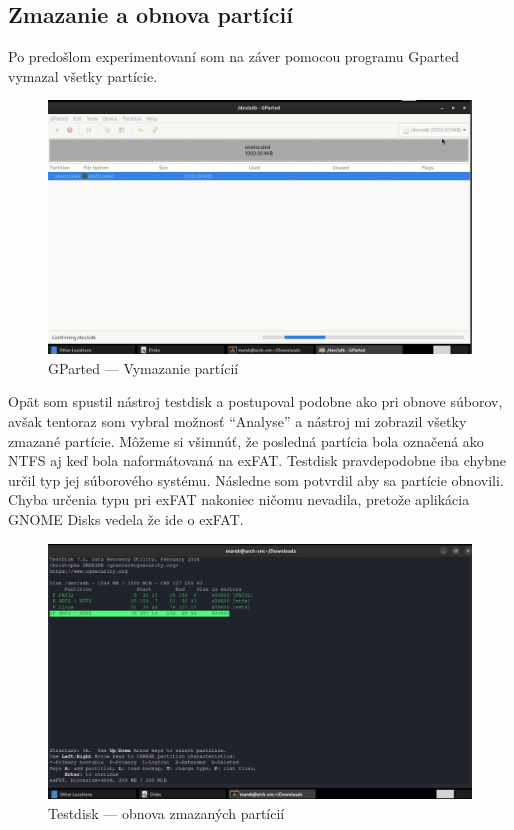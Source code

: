 \documentclass[12pt,oneside,slovak,a4paper]{article}
\begin{document}
\subsection{Zmazanie a obnova partícií}
Po predošlom experimentovaní som na záver pomocou programu Gparted vymazal všetky partície.

\begin{figure}[H]
	\centering
	\includegraphics[width=\linewidth]{./images/testdisk_testing/partitions_deletion.png}
	\centering
	\captionsetup{justification=centering,margin=2cm}
	\caption{GParted --- Vymazanie partícií}
\end{figure}

Opät som spustil nástroj testdisk a postupoval podobne ako pri obnove súborov, avšak tentoraz som vybral možnosť ``Analyse'' a nástroj mi zobrazil všetky zmazané partície. Môžeme si všimnúť, že posledná partícia bola označená ako NTFS aj keď bola naformátovaná na exFAT. Testdisk pravdepodobne iba chybne určil typ jej súborového systému. Následne som potvrdil aby sa partície obnovili. Chyba určenia typu pri exFAT nakoniec ničomu nevadila, pretože aplikácia GNOME Disks vedela že ide o exFAT. 

\begin{figure}[H]
	\centering
	\includegraphics[width=\linewidth]{./images/testdisk_testing/partitions_recovery.png}
	\centering
	\captionsetup{justification=centering,margin=2cm}
	\caption{Testdisk --- obnova zmazaných partícií}
\end{figure}
\end{document}
